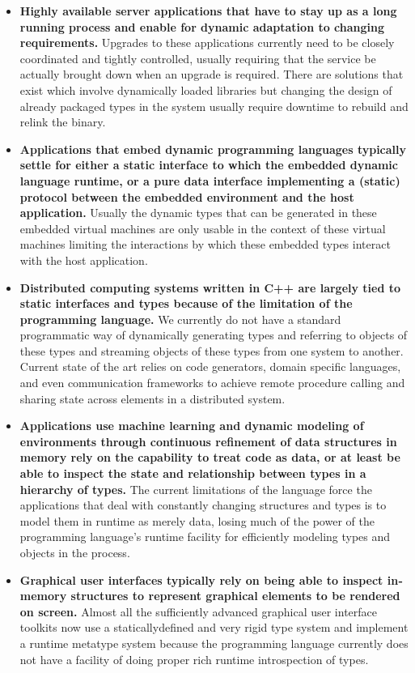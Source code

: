 \documentclass[10pt,a4paper]{article}
\begin{document}
\begin{itemize}
\item \textbf{Highly available server applications that have to stay up as a
long running process and enable for dynamic adaptation to changing
requirements.} Upgrades to these applications currently need to be closely
coordinated and tightly controlled, usually requiring that the service be
actually brought down when an upgrade is required. There are solutions that
exist which involve dynamically loaded libraries but changing the design of
already packaged types in the system usually require downtime to rebuild and
relink the binary.

\item \textbf{Applications that embed dynamic programming languages typically
settle for either a static interface to which the embedded dynamic language
runtime, or a pure data interface implementing a (static) protocol between the
embedded environment and the host application.} Usually the dynamic types that
can be generated in these embedded virtual machines are only usable in the
context of these virtual machines limiting the interactions by which these
embedded types interact with the host application.

\item \textbf{Distributed computing systems written in C++ are largely tied to
static interfaces and types because of the limitation of the programming
language.} We currently do not have a standard programmatic way of dynamically
generating types and referring to objects of these types and streaming objects
of these types from one system to another. Current state of the art relies on
code generators, domain specific languages, and even communication frameworks to
achieve remote procedure calling and sharing state across elements in a
distributed system.

\item \textbf{Applications use machine learning and dynamic modeling of
environments through continuous refinement of data structures in memory rely on
the capability to treat code as data, or at least be able to inspect the state
and relationship between types in a hierarchy of types.} The current limitations
of the language force the applications that deal with constantly changing
structures and types is to model them in runtime as merely data, losing much of
the power of the programming language’s runtime facility for efficiently
modeling types and objects in the process.

\item \textbf{Graphical user interfaces typically rely on being able to inspect
in­memory structures to represent graphical elements to be rendered on screen.}
Almost all the sufficiently advanced graphical user interface toolkits now use a
statically­defined and very rigid type system and implement a runtime meta­type
system because the programming language currently does not have a facility of
doing proper rich runtime introspection of types.
\end{itemize}
\end{document}
